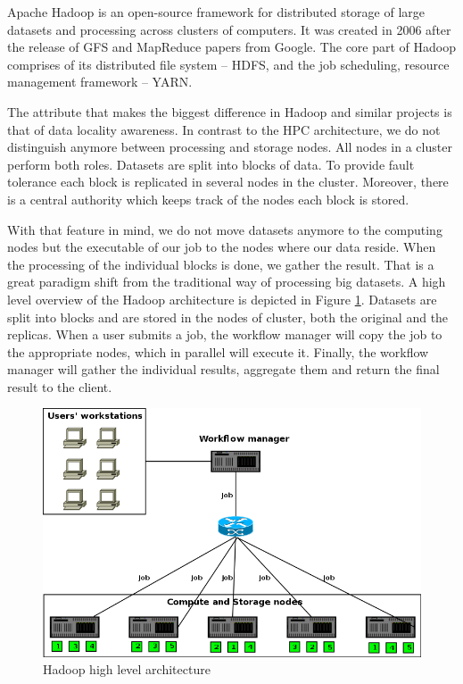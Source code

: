 Apache Hadoop is an open-source framework for distributed storage of
large datasets and processing across clusters of computers. It was
created in 2006 after the release of GFS
\cite{Ghemawat:2003:GFS:1165389.945450} and MapReduce
\cite{Dean:2004:MSD:1251254.1251264} papers from Google. The core part
of Hadoop comprises of its distributed file system -- HDFS, and the
job scheduling, resource management framework -- YARN.

The attribute that makes the biggest difference in Hadoop and similar
projects is that of data locality awareness. In contrast to the HPC
architecture, we do not distinguish anymore between processing and
storage nodes. All nodes in a cluster perform both roles. Datasets are
split into blocks of data. To provide fault tolerance each block is
replicated in several nodes in the cluster. Moreover, there is a
central authority which keeps track of the nodes each block is stored.

With that feature in mind, we do not move datasets anymore to the
computing nodes but the executable of our job to the nodes where our
data reside. When the processing of the individual blocks is done, we
gather the result. That is a great paradigm shift from the traditional way
of processing big datasets. A high level overview of the Hadoop
architecture is depicted in Figure
\ref{fig:hadoop_arch_overview}. Datasets are split into blocks and
are stored in the nodes of cluster, both the original and the
replicas. When a user submits a job, the workflow manager will copy
the job to the appropriate nodes, which in parallel will execute
it. Finally, the workflow manager will gather the individual results,
aggregate them and return the final result to the client.

\begin{figure}
\centering
\includegraphics[scale=0.5]{resources/images/Background/hadoop_arch_overview.png}
\caption{Hadoop high level architecture}
\label{fig:hadoop_arch_overview}
\end{figure}